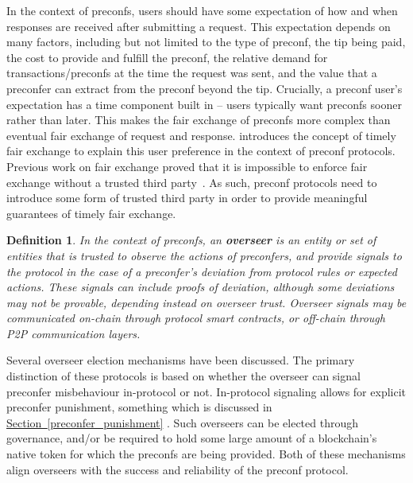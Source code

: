\documentclass[a4paper]{article}
\theoremstyle{boldstyle}
\newtheorem{definitionx}{Definition}
\newenvironment{definition}
  {\begin{defopenboxq}\begin{definitionx}}
  {\end{definitionx}\end{defopenboxq}}
\newcommand{\todoks}[1]{\todo[color=purple!40]{\textbf{Katerina:} #1}}
\begin{document}
    In the context of preconfs, users should have some expectation of how and when responses are received after submitting a request. This expectation depends on many factors, including but not limited to the type of preconf, the tip being paid, the cost to provide and fulfill the preconf, the relative demand for transactions/preconfs at the time the request was sent, and the value that a preconfer can extract from the preconf beyond the tip. Crucially, a preconf user's expectation has a time component built in -- users typically want preconfs sooner rather than later. This makes the fair exchange of preconfs more complex than eventual fair exchange of request and response. \cite{W:PreconfirmationFairExchange} introduces the concept of timely fair exchange to explain this user preference in the context of preconf protocols. Previous work on fair exchange proved that it is impossible to enforce fair exchange without a trusted third party~\cite{P:OntheImpossibilityofFairExchangewithoutaTrustedThirdParty}. As such, preconf protocols need to introduce some form of trusted third party in order to provide meaningful guarantees of timely fair exchange.
    
    \begin{definition}
    \label{def:overseer}
    In the context of preconfs, an \textbf{overseer} is an entity or set of entities that is trusted to observe the actions of preconfers, and provide signals to the protocol in the case of a preconfer's deviation from protocol rules or expected actions. These signals can include proofs of deviation, although some deviations may not be provable, depending instead on overseer trust. Overseer signals may be communicated on-chain through protocol smart contracts, or off-chain through P2P communication layers.
    \end{definition}

    Several overseer election mechanisms have been discussed. The primary distinction of these protocols is based on whether the overseer can signal preconfer misbehaviour in-protocol or not. In-protocol signaling allows for explicit preconfer punishment, something which is discussed in \hyperref[preconfer_punishment]{Section~\ref{preconfer_punishment}} \todoks{internal ref}.
    Such overseers can be elected through governance, and/or be required to hold some large amount of a blockchain's native token for which the preconfs are being provided. Both of these mechanisms align overseers with the success and reliability of the preconf protocol. 
    
\end{document}
